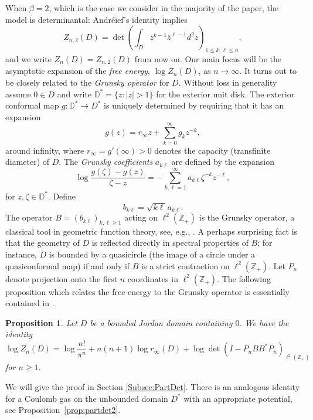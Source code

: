 \documentclass{article}
\numberwithin{equation}{section}
\numberwithin{figure}{section}
\theoremstyle{plain}
\theoremstyle{plain}
\numberwithin{thm}{section}
\newtheorem{proposition}[thm]{Proposition}
\theoremstyle{remark}
\newcommand{\D}{\mathbb{D}}
\newcommand{\Z}{\mathbb{Z}}
\let \le \leqslant
\let \ge \geqslant
\begin{document}
When $\beta=2$, which is the case we consider in the majority of the paper, the model is determinantal: Andr\'eief's identity implies
\[ Z_{n,2}(D)= \det \left( \int_D z^{k-1} \overline{z}^{\ell-1} d^2 z \right)_{1 \le k, \ell \le n},\]
and we write $Z_n(D) = Z_{n,2}(D)$ from now on. Our main focus will be the asymptotic expansion of the \emph{free energy}, $\log Z_n(D)$, as $n\to \infty$.  It turns out to be closely related to the \emph{Grunsky operator} for $D$. Without loss in generality assume $ 0 \in D$ and write
 $\D^* =\{z:|z|>1\}$ for the exterior unit disk. The exterior conformal map $g:\D^*\to D^*$ is
uniquely determined by requiring that it has an expansion
\begin{equation}\label{psiexp}
g(z)=r_\infty z+\sum_{k=0}^\infty g_k z^{-k},
\end{equation}
around infinity, where $r_\infty = g'(\infty)>0$ denotes the capacity (transfinite diameter) of $D$. The \emph{Grunsky coefficients} $a_{k\ell}$ are defined by the expansion
\begin{equation}\label{defGrunsky}
\log\frac{g(\zeta)-g(z)}{\zeta-z}=-\sum_{k,\ell=1}^\infty a_{k\ell}\zeta^{-k}z^{-\ell},
\end{equation}
for $z,\zeta\in\D^*$. Define 
\begin{equation}\label{bkl}
b_{k\ell}=\sqrt{k\ell}a_{k\ell}.
\end{equation}
The operator $B=(b_{k\ell})_{k,\ell\ge 1}$ acting on $\ell^2(\Z_+)$ is the Grunsky operator, a classical tool in geometric function theory, see, e.g., \cite{Po}. A perhaps surprising fact is that the geometry of $D$ is reflected directly in spectral properties of $B$; for instance, $D$ is bounded by a quasicircle (the image of a circle under a quasiconformal map) if and only if $B$ is a strict contraction on $\ell^2(\Z_+)$. Let $P_n$ denote projection onto the first $n$ coordinates in $\ell^2(\Z_+)$. The following proposition which relates the free energy to the Grunsky operator is essentially contained in
\cite[Ch. II, Sec. 3.3]{TT}.
\begin{proposition}\label{Prop:PartDet}
Let $D$ be a bounded Jordan domain containing $0$. We have the identity 
\begin{equation}\label{PartDetId}
\log Z_n(D)=\log \frac{n!}{\pi^n} + n(n+1) \log  r_\infty(D)  + \log \det(I-P_nBB^*P_n)_{\ell^2(\Z_+)}
\end{equation}
for $n\ge 1$.
\end{proposition}


We will give the proof in Section \ref{Subsec:PartDet}. There is an analogous identity for  a Coulomb gas on the unbounded domain $D^*$ with an appropriate potential, see Proposition~\ref{prop:partdet2}. 
\end{document}
